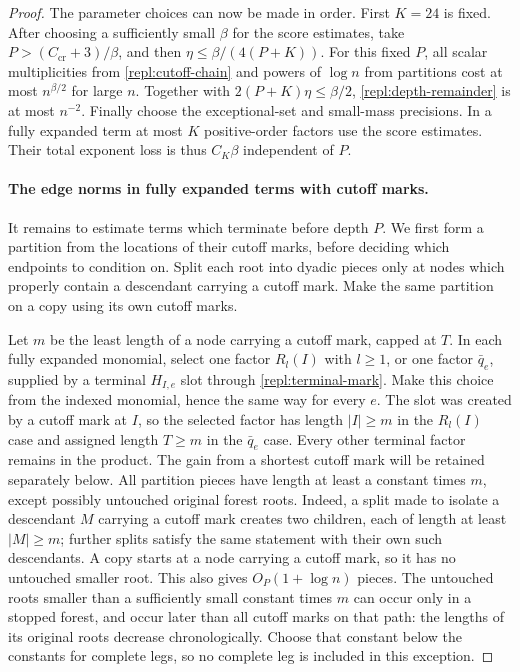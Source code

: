 \begin{proof}
The parameter choices can now be made in order.  First $K=24$ is fixed.
After choosing a sufficiently small $\beta$ for the score estimates, take
$P>(C_{\mathrm{cr}}+3)/\beta$, and then
$\eta\le\beta/(4(P+K))$.  For this fixed $P$, all scalar multiplicities
from \eqref{repl:cutoff-chain} and powers of $\log n$ from partitions cost
at most $n^{\beta/2}$ for large $n$.  Together with
$2(P+K)\eta\le\beta/2$, \eqref{repl:depth-remainder} is at most $n^{-2}$.
Finally choose the exceptional-set and small-mass precisions.  In a fully
expanded term at most $K$ positive-order factors use the score estimates.
Their total exponent loss is thus $C_K\beta$ independent of $P$.

\paragraph{The edge norms in fully expanded terms with cutoff marks.}
It remains to estimate terms which terminate before depth $P$.  We first
form a partition from the locations of their cutoff marks, before deciding
which endpoints to condition on.  Split each root into dyadic pieces only
at nodes which properly contain a descendant carrying a cutoff mark.  Make
the same partition on a copy using its own cutoff marks.

Let $m$ be the least length of a node carrying a cutoff mark, capped at $T$.
In each fully expanded monomial, select one factor $R_l(I)$ with $l\ge1$, or
one factor $\bar q_e$, supplied by a terminal $H_{I,e}$ slot through
\eqref{repl:terminal-mark}.  Make this choice from the indexed monomial,
hence the same way for every $e$.  The slot was created by a cutoff mark at
$I$, so the selected factor has length $|I|\ge m$ in the $R_l(I)$ case and
assigned length $T\ge m$ in the $\bar q_e$ case.  Every other terminal factor
remains in the product.  The gain from a shortest cutoff mark will be retained
separately below.  All partition pieces have length at
least a constant times $m$, except possibly untouched original forest
roots.  Indeed, a split made to isolate a descendant $M$ carrying a cutoff
mark creates two children, each of length at least $|M|\ge m$; further
splits satisfy the same statement with their own such descendants.  A copy
starts at a node carrying a cutoff mark, so it has no untouched smaller
root.  This also gives $O_P(1+\log n)$ pieces.  The untouched roots smaller
than a sufficiently small constant times $m$ can occur only in a stopped
forest, and occur later than all cutoff marks on that path: the lengths of
its original roots decrease chronologically.  Choose that constant below
the constants for complete legs, so no complete leg is included in this
exception.


\end{proof}
